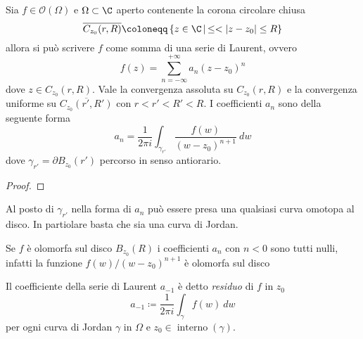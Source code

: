 \begin{theorem}
  Sia $f \in \mathcal{O}(\Omega)$ e $\Omega \subset \C$ aperto contenente la
  corona circolare chiusa 
  \begin{equation*}
    \overline{C_{z_0}(r,R)} \coloneqq \left\{ z \in \C \,\middle|\,
            \le < |z - z_0| \le R \right\}
  \end{equation*}
  allora si può scrivere $f$ come somma di una serie di Laurent, ovvero 
  \begin{equation*}
    f(z) = \sum_{n = -\infty}^{+\infty} a_n(z-z_0)^n
  \end{equation*}
  dove $z \in C_{z_0}(r,R)$. Vale la convergenza assoluta su $C_{z_0}(r,R)$ e la
  convergenza uniforme su $\overline{C_{z_0}(r',R')}$ con $r < r' < R' < R$.
  I coefficienti $a_n$ sono della seguente forma 
  \begin{equation*}
    a_n = \frac{1}{2\pi i} \int_{\gamma_{r'}} \frac{f(w)}{(w-z_0)^{n+1}}\ dw
  \end{equation*}
  dove $\gamma_{r'} = \partial B_{z_0}(r')$ percorso in senso antiorario.
  \label{thr:function_as_laurent_series}
\end{theorem}
\begin{proof}
\end{proof}

\begin{remark}
  Al posto di $\gamma_{r'}$ nella forma di $a_n$ può essere presa una qualsiasi
  curva omotopa al disco. In partiolare basta che sia una curva di Jordan.
  \label{rmk:cambiamento_bordo_di_integrazione}
\end{remark}

\begin{remark}
  Se $f$ è olomorfa sul disco $B_{z_0}(R)$ i coefficienti $a_n$ con $n < 0$ sono
  tutti nulli, infatti la funzione $f(w) / (w-z_0)^{n+1}$ è olomorfa sul disco
  \label{rmk:coefficienti_negativi}
\end{remark}

\begin{definition}
  Il coefficiente della serie di Laurent $a_{-1}$ è detto \emph{residuo} di $f$
  in $z_0$ 
  \begin{equation*}
    a_{-1} \coloneqq \frac{1}{2\pi i} \int_{\gamma} f(w)\ dw
  \end{equation*}
  per ogni curva di Jordan $\gamma$ in $\Omega$ e $z_0 \in
  \operatorname{interno}(\gamma)$.
  \label{def:residuo}
\end{definition}

